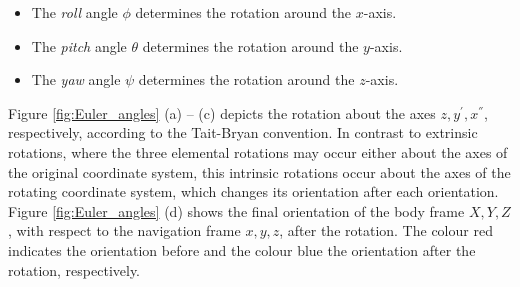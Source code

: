 \begin{itemize}
\item The \emph{roll} angle $\phi$ determines the rotation around the $x$-axis.
\item The \emph{pitch} angle $\theta$ determines the rotation around the $y$-axis.
\item The \emph{yaw} angle $\psi$ determines the rotation around the $z$-axis.
\end{itemize}

\noindent
Figure \ref{fig:Euler_angles} (a) -- (c) depicts the rotation about the axes $z, y^{'}, x^{''}$, respectively, according to the Tait-Bryan convention. In contrast to extrinsic rotations, where the three elemental rotations may occur either about the axes of the original coordinate system, this intrinsic rotations occur about the axes of the rotating coordinate system, which changes its orientation after each orientation. Figure \ref{fig:Euler_angles} (d) shows the final orientation of the body frame $X, Y, Z$, with respect to the navigation frame $x, y, z$, after the rotation. The colour red indicates the orientation before and the colour blue the orientation after the rotation, respectively.

